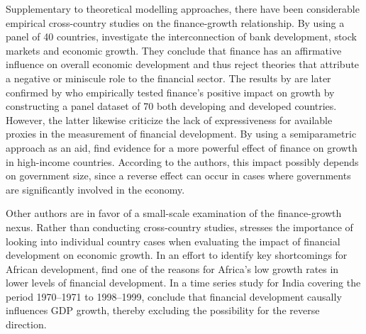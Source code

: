 \documentclass[12pt, a4paper]{article}
\begin{document}
Supplementary to theoretical modelling approaches, there have been considerable empirical cross-country studies on the finance-growth relationship. By using a panel of 40 countries,  investigate the interconnection of bank development, stock markets and economic growth. They conclude that finance has an affirmative influence on overall economic development and thus reject theories that attribute a negative or miniscule role to the financial sector. The results by  are later confirmed by  who empirically tested finance's positive impact on growth by constructing a panel dataset of 70 both developing and developed countries. However, the latter likewise criticize the lack of expressiveness for available proxies in the measurement of financial development. By using a semiparametric approach as an aid,  find evidence for a more powerful effect of finance on growth in high-income countries. According to the authors, this impact possibly depends on government size, since a reverse effect can occur in cases where governments are significantly involved in the economy.

Other authors are in favor of a small-scale examination of the finance-growth nexus. Rather than conducting cross-country studies,  stresses the importance of looking into individual country cases when evaluating the impact of financial development on economic growth. In an effort to identify key shortcomings for African development,  find one of the reasons for Africa's low growth rates in lower levels of financial development. In a time series study for India covering the period 1970–1971 to 1998–1999,  conclude that financial development causally influences GDP growth, thereby excluding the possibility for the reverse direction.
\end{document}
